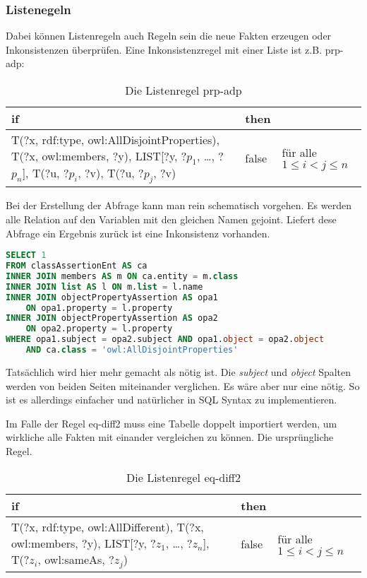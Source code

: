 \subsubsection{Listenegeln}
Dabei können Listenregeln auch Regeln sein die neue Fakten erzeugen oder Inkonsistenzen überprüfen. Eine Inkonsistenzregel mit einer Liste ist z.B. prp-adp:
\begin{table}[htb]
\begin{center}
	\begin{tabular}{M{7cm}|M{1.2cm}|M{2.5cm}}
	if & then & \\ \hline
	T(?x, rdf:type, owl:AllDisjointProperties),\newline
	T(?x, owl:members, ?y),\newline
	LIST[?y, ?$p_1$, \ldots, ?$p_n$],\newline
	T(?u, ?$p_i$, ?v),\newline
	T(?u, ?$p_j$, ?v) & false & für alle $1 \leq i < j \leq n$
	\end{tabular}
\end{center}
	\caption{Die Listenregel prp-adp}
	\label{rule-prp-adp}
\end{table}


Bei der Erstellung der Abfrage kann man rein schematisch vorgehen. Es werden alle Relation auf den Variablen mit den gleichen Namen gejoint. Liefert dese Abfrage ein Ergebnis zurück ist eine Inkonsistenz vorhanden.

\begin{lstlisting}[language=SQL]
SELECT 1
FROM classAssertionEnt AS ca
INNER JOIN members AS m ON ca.entity = m.class
INNER JOIN list AS l ON m.list = l.name
INNER JOIN objectPropertyAssertion AS opa1
	ON opa1.property = l.property
INNER JOIN objectPropertyAssertion AS opa2
	ON opa2.property = l.property
WHERE opa1.subject = opa2.subject AND opa1.object = opa2.object
	AND ca.class = 'owl:AllDisjointProperties'
\end{lstlisting}

Tatsächlich wird hier mehr gemacht als nötig ist. Die \emph{subject} und \emph{object} Spalten werden von beiden Seiten miteinander verglichen. Es wäre aber nur eine nötig. So ist es allerdings einfacher und natürlicher in SQL Syntax zu implementieren.

Im Falle der Regel eq-diff2 muss eine Tabelle doppelt importiert werden, um wirkliche alle Fakten mit einander vergleichen zu können. Die ursprüngliche Regel.
\begin{table}[htb]
\begin{center}
	\begin{tabular}{M{7cm}|M{1.2cm}|M{2.5cm}}
	if & then & \\ \hline
	T(?x, rdf:type, owl:AllDifferent),\newline
	T(?x, owl:members, ?y),\newline
	LIST[?y, ?$z_1$, \ldots, ?$z_n$],\newline
	T(?$z_i$, owl:sameAs, ?$z_j$) & false & für alle $1 \leq i < j \leq n$
	\end{tabular}
\end{center}
	\caption{Die Listenregel eq-diff2}
	\label{rule-eq-diff2}
\end{table}


